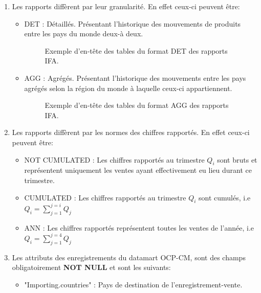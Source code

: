 	\begin{enumerate}
	\item Les rapports diffèrent par leur granularité. En effet ceux-ci peuvent être:
		\begin{itemize}
		\item DET : Détaillés. Présentant l'historique des mouvements de produits entre les pays du monde deux-à deux.
		\begin{figure}[h]
					    		\centering
					    		\caption{Exemple d'en-tête des tables du format DET des rapports IFA.}
				\end{figure}
		\item AGG : Agrégés. Présentant l'historique des mouvements entre les pays agrégés selon la région du monde à laquelle ceux-ci appartiennent.
		\begin{figure}[h]
			    		\centering
			    		\caption{Exemple d'en-tête des tables du format  AGG des rapports IFA.}
		\end{figure}
		\end{itemize}
	\item Les rapports diffèrent par les normes des chiffres rapportés. En effet ceux-ci peuvent être:
		\begin{itemize}
		\item NOT CUMULATED : Les chiffres rapportés au trimestre ${Q_i}$ sont bruts et représentent uniquement les ventes ayant effectivement eu lieu durant ce trimestre.
		\item CUMULATED : Les chiffres rapportés au trimestre ${Q_i}$ sont cumulés, i.e ${Q_i = \sum_{j=1}^{j=i} Q_j}$
		\item ANN : Les chiffres rapportés représentent toutes les ventes de l'année, i.e ${Q_i = \sum_{j=1}^{j=4} Q_j}$
		\end{itemize}
	\item Les attributs des enregistrements du datamart OCP-CM, sont des champs obligatoirement \textbf{NOT NULL} et sont les suivants:
	\begin{itemize}
	\item "Importing.countries" : Pays de destination de l'enregistrement-vente.

\end{itemize}
\end{enumerate}
